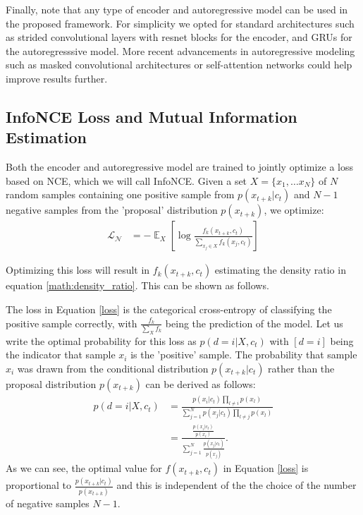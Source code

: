 Finally, note that any type of encoder and autoregressive model can be used in the proposed framework. For simplicity we opted for standard architectures such as strided convolutional layers with resnet blocks for the encoder, and GRUs \cite{cho2014learning} for the autoregresssive model. More recent advancements in autoregressive modeling such as masked convolutional architectures \cite{oord2016wavenet, aaron2016pixelcnn} or self-attention networks \cite{attentionNIPS2017} could help improve results further.

\subsection{InfoNCE Loss and Mutual Information Estimation}
\label{sec:nce}

Both the encoder and autoregressive model are trained to jointly optimize a loss based on NCE, which we will call InfoNCE. Given a set $X=\{x_1, \dots x_{N}\}$ of $N$ random samples containing one positive sample from $p(x_{t+k}|c_t)$ and $N-1$ negative samples from the 'proposal' distribution $p(x_{t+k})$, we optimize:
\begin{align}
\mathcal{L_{\text{N}}} &= - \mathop{{}\mathbb{E}}_{X}\left[\log \frac{f_k(x_{t+k}, c_{t})}{\sum_{x_j \in X} f_k(x_j, c_{t})}\right] \label{loss}
\end{align}

Optimizing this loss will result in $f_k(x_{t+k}, c_{t})$ estimating the density ratio in equation \ref{math:density_ratio}. This can be shown as follows.

The loss in Equation \ref{loss} is the categorical cross-entropy of classifying the positive sample correctly, with $\frac{f_k}{\sum_{X} f_k}$ being the prediction of the model. Let us write the optimal probability for this loss as $p(d=i|X, c_{t})$ with $[d=i]$ being the indicator that sample $x_i$ is the 'positive' sample. The probability that sample $x_i$ was drawn from the conditional distribution $p(x_{t+k}|c_{t})$ rather than the proposal distribution $p(x_{t+k})$ can be derived as follows:
\begin{align}
p(d = i| X, c_{t}) &= \frac{p(x_i|c_{t})\prod_{l\neq i}p(x_l)}{\sum^N_{j=1} p(x_j|c_{t})\prod_{l\neq j}p(x_l)} \nonumber \\
&=\frac{\frac{p(x_i|c_{t})}{p(x_i)}}{\sum^N_{j=1} \frac{p(x_j|c_{t})}{p(x_j)}}.
\end{align}
As we can see, the optimal value for $f(x_{t+k}, c_{t})$ in Equation \ref{loss} is proportional to $\frac{p(x_{t+k}|c_{t})}{p(x_{t+k})}$ and this is independent of the the choice of the number of negative samples $N-1$.

